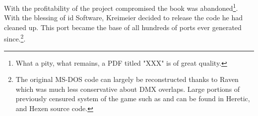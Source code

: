  \par
  With the profitability of the project compromised the book was abandoned\footnote{What a pity, what remains, a PDF titled "XXX" is of great quality.}. With the blessing of id Software, Kreimeier decided to release the code he had cleaned up. This port became the base of all hundreds of ports ever generated since.\footnote{The original MS-DOS code can largely be reconstructed thanks to Raven which was much less conservative about DMX overlaps. Large portions of previously censured system of the game such as  and  can be found in Heretic, and Hexen source code.}.\\
 \par  



